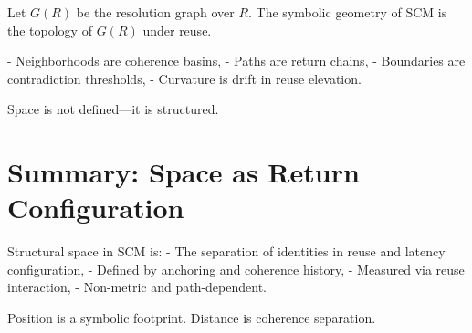 Let $G(R)$ be the resolution graph over $R$. The symbolic geometry of SCM is the topology of $G(R)$ under reuse.

- Neighborhoods are coherence basins,
- Paths are return chains,
- Boundaries are contradiction thresholds,
- Curvature is drift in reuse elevation.

Space is not defined—it is structured.

\section{Summary: Space as Return Configuration} \label{sec:space-summary}

Structural space in SCM is:
- The separation of identities in reuse and latency configuration,
- Defined by anchoring and coherence history,
- Measured via reuse interaction,
- Non-metric and path-dependent.

Position is a symbolic footprint. Distance is coherence separation.

